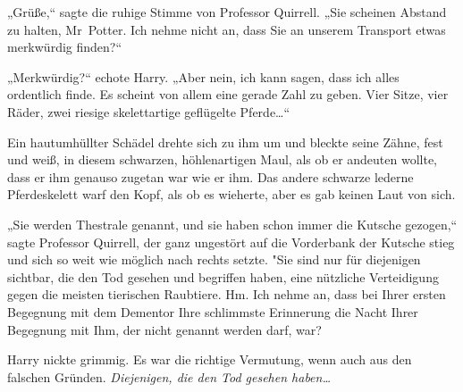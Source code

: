 „Grüße,“ sagte die ruhige Stimme von Professor Quirrell. „Sie scheinen Abstand zu halten, Mr~Potter. Ich nehme nicht an, dass Sie an unserem Transport etwas merkwürdig finden?“

„Merkwürdig?“ echote Harry. „Aber nein, ich kann sagen, dass ich alles ordentlich finde. Es scheint von allem eine gerade Zahl zu geben. Vier Sitze, vier Räder, zwei riesige skelettartige geflügelte Pferde…“

Ein hautumhüllter Schädel drehte sich zu ihm um und bleckte seine Zähne, fest und weiß, in diesem schwarzen, höhlenartigen Maul, als ob er andeuten wollte, dass er ihm genauso zugetan war wie er ihm. Das andere schwarze lederne Pferdeskelett warf den Kopf, als ob es wieherte, aber es gab keinen Laut von sich.

„Sie werden Thestrale genannt, und sie haben schon immer die Kutsche gezogen,“ sagte Professor Quirrell, der ganz ungestört auf die Vorderbank der Kutsche stieg und sich so weit wie möglich nach rechts setzte. "Sie sind nur für diejenigen sichtbar, die den Tod gesehen und begriffen haben, eine nützliche Verteidigung gegen die meisten tierischen Raubtiere. Hm. Ich nehme an, dass bei Ihrer ersten Begegnung mit dem Dementor Ihre schlimmste Erinnerung die Nacht Ihrer Begegnung mit Ihm, der nicht genannt werden darf, war?

Harry nickte grimmig. Es war die richtige Vermutung, wenn auch aus den falschen Gründen. \emph{Diejenigen, die den Tod gesehen haben…}

